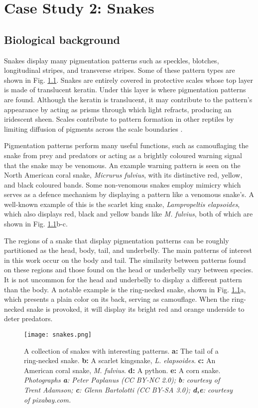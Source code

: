 \chapter{Case Study 2: Snakes}

\section{Biological background}
Snakes display many pigmentation patterns such as speckles, blotches, longitudinal stripes, and transverse stripes. Some of these pattern types are shown in Fig. \ref{fig:realSnakePatterns}. Snakes are entirely covered in protective scales whose top layer is made of translucent keratin. Under this layer is where pigmentation patterns are found. Although the keratin is translucent, it may contribute to the pattern's appearance by acting as prisms through which light refracts, producing an iridescent sheen. Scales contribute to pattern formation in other reptiles by limiting diffusion of pigments across the scale boundaries \citep{manukyan2017}.

Pigmentation patterns perform many useful functions, such as camouflaging the snake from prey and predators or acting as a brightly coloured warning signal that the snake may be venomous. An example warning pattern is seen on the North American coral snake, \textit{Micrurus fulvius}, with its distinctive red, yellow, and black coloured bands. Some non-venomous snakes employ mimicry which serves as a defence mechanism by displaying a pattern like a venomous snake's. A well-known example of this is the scarlet king snake, \textit{Lampropeltis elapsoides}, which also displays red, black and yellow bands like \textit{M. fulvius}, both of which are shown in Fig. \ref{fig:realSnakePatterns}b-c.

The regions of a snake that display pigmentation patterns can be roughly partitioned as the head, body, tail, and underbelly. The main patterns of interest in this work occur on the body and tail. The similarity between patterns found on these regions and those found on the head or underbelly vary between species. It is not uncommon for the head and underbelly to display a different pattern than the body. A notable example is the ring-necked snake, shown in Fig. \ref{fig:realSnakePatterns}a, which presents a plain color on its back, serving as camouflage. When the ring-necked snake is provoked, it will display its bright red and orange underside to deter predators.

\begin{figure}[hb]
	\centering
	\texttt{[image: snakes.png]}
	\caption{A collection of snakes with interesting patterns. \textbf{a:} The tail of a ring-necked snake. \textbf{b:} A scarlet kingsnake, \textit{L. elapsoides}. \textbf{c:} An American coral snake, \textit{M. fulvius}. \textbf{d:} A python. \textbf{e:} A corn snake. \textit{Photographs \textbf{a}: Peter Paplanus (CC BY-NC 2.0); \textbf{b}: courtesy of Trent Adamson; \textbf{c}: Glenn Bartolotti (CC BY-SA 3.0); \textbf{d,e}: courtesy of pixabay.com.}}
	\label{fig:realSnakePatterns}
\end{figure}

